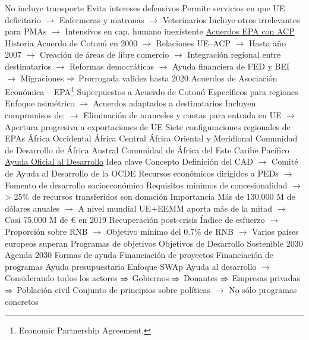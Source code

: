 \documentclass{nuevotema}
\begin{document}
\begin{esquemal}
				\4[] No incluye transporte
				\4[] Evita intereses defensivos
				\4[] Permite servicios en que UE deficitario
				\4[] $\to$ Enfermeras y matronas
				\4[] $\to$ Veterinarios
				\4[] Incluye otros irrelevantes para PMAs
				\4[] $\to$ Intensivos en cap. humano inexistente
			\3 \underline{Acuerdos EPA con ACP}
				\4 Historia
				\4[] Acuerdo de Cotonú en 2000
				\4[] $\to$ Relaciones UE--ACP
				\4[] $\to$ Hasta año 2007
				\4[] $\to$ Creación de áreas de libre comercio
				\4[] $\to$ Integración regional entre destinatarios
				\4[] $\to$ Reformas democráticas
				\4[] $\to$ Ayuda financiera de FED y BEI
				\4[] $\to$ Migraciones
				\4[] $\Rightarrow$ Prorrogada validez hasta 2020
				\4 Acuerdos de Asociación Económica -- EPA\footnote{Economic Partnership Agreement.}
				\4[] Superpuestos a Acuerdo de Cotonú
				\4[] Específicos para regiones
				\4[] Enfoque asimétrico
				\4[] $\to$ Acuerdos adaptados a destinatarios
				\4[] Incluyen compromisos de:
				\4[] $\to$ Eliminación de aranceles y cuotas para entrada en UE
				\4[] $\to$ Apertura progresiva a exportaciones de UE
				\4 Siete configuraciones regionales de EPAs
				\4[] África Occidental
				\4[] África Central
				\4[] África Oriental y Meridional
				\4[] Comunidad de Desarrollo de África Austral
				\4[] Comunidad de África del Este
				\4[] Caribe
				\4[] Pacífico
			\3[] \underline{Ayuda Oficial al Desarrollo}
			\3 Idea clave
				\4 Concepto
				\4[] Definición del CAD
				\4[] $\to$ Comité de Ayuda al Desarrollo de la OCDE
				\4[] Recursos económicos dirigidos a PEDs
				\4[] $\to$ Fomento de desarrollo socioeconómico
				\4[] Requisitos mínimos de concesionalidad
				\4[] $\to$ > 25\% de recursos transferidos son donación
				\4 Importancia
				\4[] Más de 130.000 M de dólares anuales
				\4[] $\to$ A nivel mundial
				\4[] UE+EEMM aporta más de la mitad
				\4[] $\to$ Casi 75.000 M de € en 2019
				\4[] Recuperación post-crisis
				\4[] Índice de esfuerzo
				\4[] $\to$ Proporción sobre RNB
				\4[] $\to$ Objetivo mínimo del 0.7\% de RNB
				\4[] $\to$ Varios países europeos superan
				\4 Programas de objetivos
				\4[] Objetivos de Desarrollo Sostenible 2030
				\4[] Agenda 2030
			\3 Formas de ayuda
				\4 Financiación de proyectos
				\4 Financiación de programas
				\4 Ayuda presupuestaria
				\4 Enfoque SWAp
				\4[] Ayuda al desarrollo
				\4[] $\to$ Considerando todos los actores
				\4[] $\Rightarrow$ Gobiernos
				\4[] $\Rightarrow$ Donantes
				\4[] $\Rightarrow$ Empresas privadas
				\4[] $\Rightarrow$ Población civil
				\4[] Conjunto de principios sobre políticas
				\4[] $\to$ No sólo programas concretos

\end{esquemal}
\end{document}
